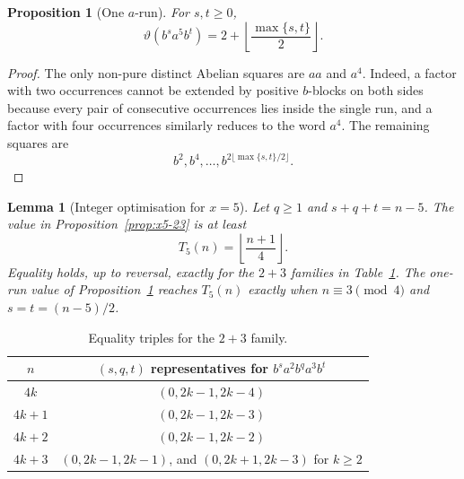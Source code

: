 \documentclass[11pt]{article}
\newtheorem{proposition}[theorem]{Proposition}
\newtheorem{lemma}[theorem]{Lemma}
\theoremstyle{definition}
\newcommand{\thetaas}{\vartheta}
\begin{document}
\begin{proposition}[One $a$-run]\label{prop:x5-one-run}
For $s,t\ge0$,
\[
 \thetaas(b^s a^5b^t)=2+\left\lfloor\frac{\max\{s,t\}}2\right\rfloor.
\]
\end{proposition}

\begin{proof}
The only non-pure distinct Abelian squares are $aa$ and $a^4$. Indeed, a factor with two occurrences cannot be extended by positive $b$-blocks on both sides because every pair of consecutive occurrences lies inside the single run, and a factor with four occurrences similarly reduces to the word $a^4$. The remaining squares are
\[
 b^2,b^4,\ldots,b^{2\lfloor\max\{s,t\}/2\rfloor}.
\]
\end{proof}

\begin{lemma}[Integer optimisation for $x=5$]\label{lem:x5-optimisation}
Let $q\ge1$ and $s+q+t=n-5$. The value in Proposition~\ref{prop:x5-23} is at least
\[
 T_5(n)=\left\lfloor\frac{n+1}{4}\right\rfloor.
\]
Equality holds, up to reversal, exactly for the $2+3$ families in Table~\ref{tab:x5-triples}. The one-run value of Proposition~\ref{prop:x5-one-run} reaches $T_5(n)$ exactly when $n\equiv3\pmod4$ and $s=t=(n-5)/2$.
\end{lemma}

\begin{table}[ht]
\centering
\begin{tabular}{c|c}
\toprule
$n$ & $(s,q,t)$ representatives for $b^sa^2b^qa^3b^t$ \\
\midrule
$4k$ & $(0,2k-1,2k-4)$ \\
$4k+1$ & $(0,2k-1,2k-3)$ \\
$4k+2$ & $(0,2k-1,2k-2)$ \\
$4k+3$ & $(0,2k-1,2k-1)$, and $(0,2k+1,2k-3)$ for $k\ge2$ \\
\bottomrule
\end{tabular}
\caption{Equality triples for the $2+3$ family.}
\label{tab:x5-triples}
\end{table}
\end{document}
